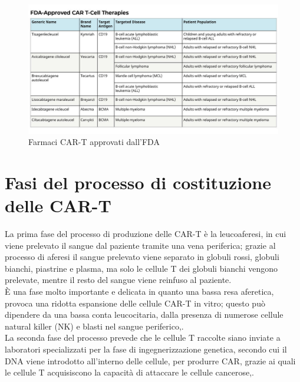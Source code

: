 \begin{figure}[H]
    \begin{center}
    \includegraphics[width=1.0\columnwidth]{img/FDAApprovedCART.jpeg}
    \end{center}
    \caption{Farmaci CAR-T approvati dall’FDA
    \cite{NIHCART}}
    \label{fig:FIGURE_3.8}
\end{figure}

\section{Fasi del processo di costituzione delle CAR-T}

La prima fase del processo di produzione delle CAR-T è la leucoaferesi, in cui viene prelevato il sangue dal 
paziente tramite una vena periferica; grazie al processo di aferesi il sangue prelevato viene separato in 
globuli rossi, globuli bianchi, piastrine e plasma, ma solo le cellule T dei globuli bianchi vengono prelevate, 
mentre il resto del sangue viene reinfuso al paziente.\\
È una fase molto importante e delicata in quanto una bassa resa aferetica, provoca una 
ridotta espansione delle cellule CAR-T in vitro; questo può dipendere da una bassa conta leucocitaria, 
dalla presenza di numerose cellule natural killer (NK) e blasti nel sangue periferico\cite{EMATOCART},\cite{LLSCART}.\\

La seconda fase del processo prevede che le cellule T raccolte siano inviate a laboratori specializzati per la fase 
di ingegnerizzazione genetica, secondo cui il DNA viene introdotto all’interno delle cellule, per produrre CAR, 
grazie ai quali le cellule T acquisiscono la capacità di attaccare le cellule cancerose\cite{EMATOCART},\cite{LLSCART}.\\

